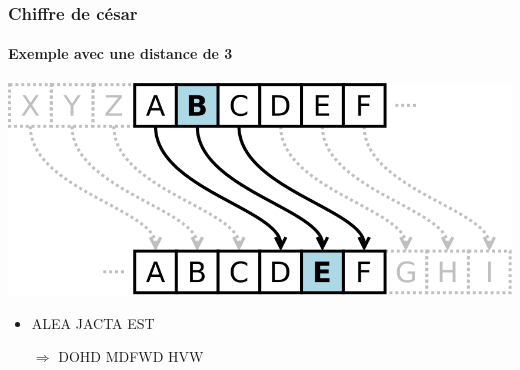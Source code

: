 \documentclass[xcolor={dvipsnames}]{beamer}
\begin{document}
\begin{frame}
	\frametitle{Chiffre de césar}
	\framesubtitle{Exemple avec une distance de 3}
	
	
	\begin{center}
		\includegraphics[scale=0.2]{cesar}			
	\end{center}
	
	\begin{itemize}
		\item ALEA JACTA EST\pause
		\item[$\Rightarrow$] DOHD MDFWD HVW
	\end{itemize}
	
	
\end{frame}


%	
%	
%		
%		
%		
%	
%	
\end{document}
